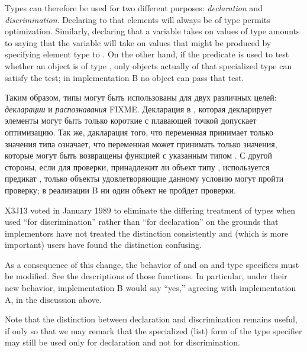 \begin{obsolete}
Types can therefore be used for two different purposes:
\emph{declaration} and \emph{discrimination}.  Declaring to 
that elements will always be of type  permits
optimization.  Similarly, declaring that a variable takes on
values of type  amounts to saying that
the variable will take on values that might be produced by specifying
element type  to .
On the other hand, if the predicate  is used to test
whether an object is of type ,
only objects actually of that specialized type can satisfy the test;
in implementation B no object can pass that test.

Таким образом, типы могут быть использованы для двух различных целей:
\emph{декларации} и \emph{распознавания} FIXME. Декларация в
, которая декларирует
элементы могут быть только короткие с плавающей точкой допускает
оптимизацию. Так же, дакларация того, что переменная принимает только значения
типа  означает, что переменная может принимать только
значения, которые могут быть возвращены функцией  с указанным
типом . С другой стороны, если для проверки, принадлежит ли
объект типу , используется предикат , только
объекты удовлетворяющие данному условию могут пройти проверку; в реализации B ни
один объект не пройдет проверки. 
\end{obsolete}

\begin{new}
X3J13 voted in January 1989
to eliminate the differing treatment of types
when used ``for discrimination'' rather than ``for declaration'' on the grounds
that implementors have not treated the distinction consistently
and (which is more important) users have found the distinction confusing.

As a consequence of this change, the behavior of  and 
on  and  type specifiers must be modified.
See the descriptions of those functions.  In particular, under their new
behavior, implementation B would say ``yes,'' agreeing with implementation A,
in the discussion above.

Note that the distinction between declaration and discrimination remains
useful, if only so that we may remark that the specialized (list)
form of the
 type specifier may still be used only for declaration and
not for discrimination.
\end{new}

